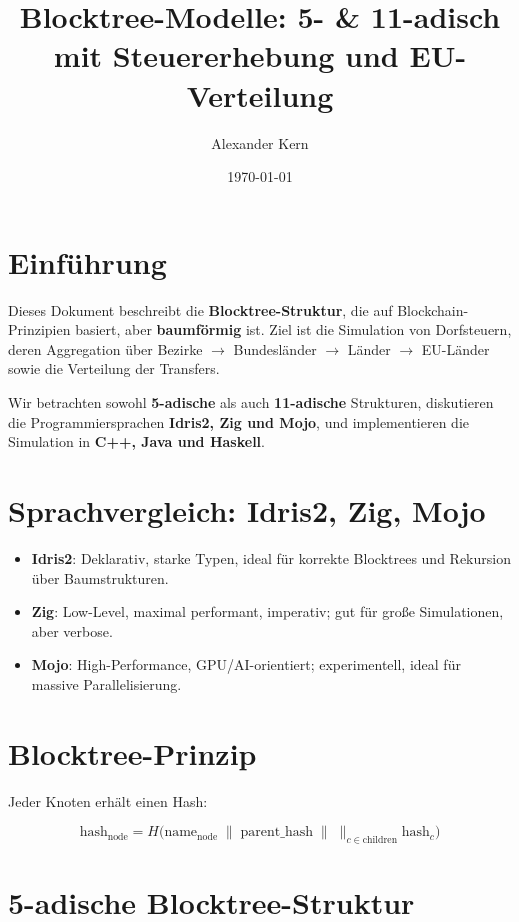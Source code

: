 \documentclass[a4paper,12pt]{article}
\title{Blocktree-Modelle: 5- & 11-adisch mit Steuererhebung und EU-Verteilung}
\author{Alexander Kern}
\date{\today}
\begin{document}
\maketitle

\section{Einführung}

Dieses Dokument beschreibt die \textbf{Blocktree-Struktur}, die auf Blockchain-Prinzipien basiert, aber \textbf{baumförmig} ist.  
Ziel ist die Simulation von Dorfsteuern, deren Aggregation über Bezirke $\to$ Bundesländer $\to$ Länder $\to$ EU-Länder sowie die Verteilung der Transfers.  

Wir betrachten sowohl \textbf{5-adische} als auch \textbf{11-adische} Strukturen, diskutieren die Programmiersprachen \textbf{Idris2, Zig und Mojo}, und implementieren die Simulation in \textbf{C++, Java und Haskell}.

\section{Sprachvergleich: Idris2, Zig, Mojo}

\begin{itemize}
\item \textbf{Idris2}: Deklarativ, starke Typen, ideal für korrekte Blocktrees und Rekursion über Baumstrukturen.
\item \textbf{Zig}: Low-Level, maximal performant, imperativ; gut für große Simulationen, aber verbose.
\item \textbf{Mojo}: High-Performance, GPU/AI-orientiert; experimentell, ideal für massive Parallelisierung.
\end{itemize}

\section{Blocktree-Prinzip}

Jeder Knoten erhält einen Hash:

\[
\text{hash}_{\text{node}} = H\Big(\text{name}_{\text{node}} \; \| \; \text{parent\_hash} \; \| \; \big\|_{c \in \text{children}} \text{hash}_c \Big)
\]

\section{5-adische Blocktree-Struktur}
\end{document}
